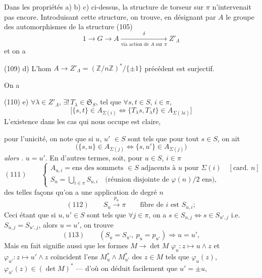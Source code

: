 \documentclass[11pt,a4paper]{article}
\begin{document}
Dans les propriétés a) b) c) ci-dessus, la structure de torseur sur $\pi$
n'intervenait pas encore. Introduisant cette structure, on trouve, en désignant
par $A$ le groupe des automorphismes de la structure (105)
\[
  1 \longrightarrow G \longrightarrow A
  \xrightarrow[\text{via action de $A$ sur $\pi$}]{\ \delta\ } Z'_{\Lambda}
\]
et on a

(109) d) L'hom $A \longrightarrow Z'_{\Lambda} = (\mathbb{Z}/n\mathbb{Z})^{*}/\{\pm 1\}$
précédent est surjectif.

On a

(110) e) $\forall \lambda\in Z'_{\Lambda}$, $\exists !\, T_{\lambda}\in\mathfrak{S}_S$,
tel que $\forall s,t\in S$, $i\in\pi$, \struck{\ill{}}
\[
  \bigl[\{s,t\}\in A_{\Sigma(i)} \Longleftrightarrow
  \{T_{\lambda}s, T_{\lambda}t\}\in A_{\Sigma(\lambda i)}\bigr]
\]
L'existence dans les cas qui nous occupe est claire,


pour l'unicité, on note que si $u$, $u'$ \struck{\ill{}} $\in S$ 
sont tels que pour tout $s\in S$, on ait
\[
  \bigl(\{s,u\}\in A_{\Sigma(j)} \Longleftrightarrow \{s,u'\}\in A_{\Sigma(j)}\bigr)
\]
\emph{alors} . $u=u'$. En d'autres termes,
soit, pour $u\in S$, $i\in\pi$
\[
  (111)\qquad
  \begin{cases}
    A_{u,i} = \text{ens des sommets $\in S$ adjacents à $u$ pour $\Sigma(i)$}
      \quad [\text{card.\ } n]\\
    S_u = \bigcup_{i\in\pi} S_{u,i} \quad
      \text{(réunion disjointe de $\varphi(n)/2$ ens)},
  \end{cases}
\]
 des telles façons qu'on a une application de degré $n$
\[
  (112)\qquad S_u \xrightarrow{\ p_u\ } \pi \qquad
  \text{fibre de $i$ est $S_{u,i}$} ;
\]
Ceci étant  que si $u,u'\in S$ sont tels que $\forall j\in\pi$, on a
$s\in S_{u,j} \Longleftrightarrow s\in S_{u',j}$ i.e.\ $S_{u,j}=S_{u',j}$,
 alors $u=u'$, on trouve
\[
  (113)\qquad (S_u=S_{u'},\ p_u=p_{u'}) \Longrightarrow u=u',
\]
Mais en fait 
\struck{\ill{}} signifie aussi que \struck{\ill{}} les formes
$M \longrightarrow \det M$ \struck{\ill{}}
$\varphi_u : z \longmapsto u\wedge z$ et $\varphi_{u'} : z\longmapsto u'\wedge z$
coïncident  l'ens $M^{*}_{u}\wedge M^{*}_{u'}$ des $z\in M$ tels
que $\varphi_u(z)$, $\varphi_{u'}(z)\in(\det M)^{*}$ — d'où on déduit
\add{\ill{}} facilement que \struck{\ill{}} $u'=\pm u$,
\end{document}

